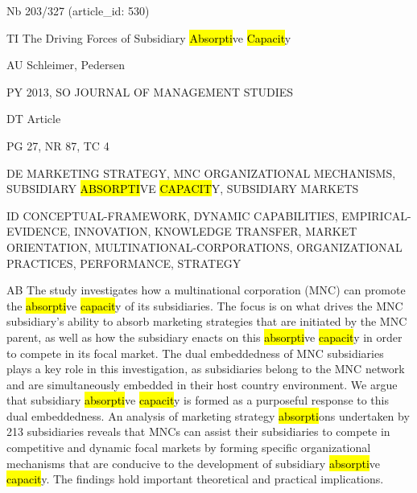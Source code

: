 \documentclass[a4paper]{article}
\begin{document}
\vspace*{-2cm}
Nb \tabto{0cm}203/327 (article\_id: 530)\par
TI \tabto{0cm}The Driving Forces of Subsidiary \hl{Absorpti}ve \hl{Capacit}y\par
AU \tabto{0cm}Schleimer, Pedersen\par
PY \tabto{0cm}2013, SO JOURNAL OF MANAGEMENT STUDIES\par
DT \tabto{0cm}Article\par
PG \tabto{0cm}27, NR 87, TC 4\par
DE \tabto{0cm}MARKETING STRATEGY, MNC ORGANIZATIONAL MECHANISMS, SUBSIDIARY \hl{ABSORPTI}VE \hl{CAPACIT}Y, SUBSIDIARY MARKETS\par
ID \tabto{0cm}CONCEPTUAL-FRAMEWORK, DYNAMIC CAPABILITIES, EMPIRICAL-EVIDENCE, INNOVATION, KNOWLEDGE TRANSFER, MARKET ORIENTATION, MULTINATIONAL-CORPORATIONS, ORGANIZATIONAL PRACTICES, PERFORMANCE, STRATEGY\par
AB \tabto{0cm}The study investigates how a multinational corporation (MNC) can promote the \hl{absorpti}ve \hl{capacit}y of its subsidiaries. The focus is on what drives the MNC subsidiary's ability to absorb marketing strategies that are initiated by the MNC parent, as well as how the subsidiary enacts on this \hl{absorpti}ve \hl{capacit}y in order to compete in its focal market. The dual embeddedness of MNC subsidiaries plays a key role in this investigation, as subsidiaries belong to the MNC network and are simultaneously embedded in their host country environment. We argue that subsidiary \hl{absorpti}ve \hl{capacit}y is formed as a purposeful response to this dual embeddedness. An analysis of marketing strategy \hl{absorpti}ons undertaken by 213 subsidiaries reveals that MNCs can assist their subsidiaries to compete in competitive and dynamic focal markets by forming specific organizational mechanisms that are conducive to the development of subsidiary \hl{absorpti}ve \hl{capacit}y. The findings hold important theoretical and practical implications.\par
\clearpage
\end{document}
